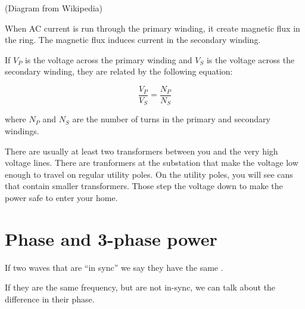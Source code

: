 (Diagram from Wikipedia)

When AC current is run through the primary winding, it create magnetic
flux in the ring.  The magnetic flux induces current in the secondary
winding.

If $V_P$ is the voltage across the primary winding and $V_S$ is the
voltage across the secondary winding, they are related by the
following equation:

$$\frac{V_P}{V_S} = \frac{N_P}{N_S}$$

where $N_P$ and $N_S$ are the number of turns in the primary and
secondary windings.

There are usually at least two transformers between you and the very
high voltage lines.  There are tranformers at the substation that make
the voltage low enough to travel on regular utility poles. On the
utility poles, you will see cans that contain smaller
transformers. Those step the voltage down to make the power safe to
enter your home.

\section{Phase and 3-phase power}

If two waves that are ``in sync'' we say they have the same .


If they are the same frequency, but are not in-sync, we can talk about
the difference in their phase.


